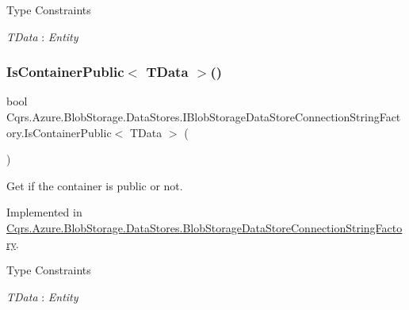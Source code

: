 \begin{Desc}
\item[Type Constraints]\begin{description}
\item[{\em T\+Data} : {\em Entity}]\end{description}
\end{Desc}
\mbox{\label{interfaceCqrs_1_1Azure_1_1BlobStorage_1_1DataStores_1_1IBlobStorageDataStoreConnectionStringFactory_a328ddc36412d9d01fed52aeed545c1a4_a328ddc36412d9d01fed52aeed545c1a4}} 
\subsubsection{\texorpdfstring{Is\+Container\+Public$<$ T\+Data $>$()}{IsContainerPublic< TData >()}}
{\footnotesize\ttfamily bool Cqrs.\+Azure.\+Blob\+Storage.\+Data\+Stores.\+I\+Blob\+Storage\+Data\+Store\+Connection\+String\+Factory.\+Is\+Container\+Public$<$ T\+Data $>$ (\begin{DoxyParamCaption}{ }\end{DoxyParamCaption})}



Get if the container is public or not. 



Implemented in \hyperlink{classCqrs_1_1Azure_1_1BlobStorage_1_1DataStores_1_1BlobStorageDataStoreConnectionStringFactory_a96e368a2b00f9614eff6ca4bcdeb3a24_a96e368a2b00f9614eff6ca4bcdeb3a24}{Cqrs.\+Azure.\+Blob\+Storage.\+Data\+Stores.\+Blob\+Storage\+Data\+Store\+Connection\+String\+Factory}.

\begin{Desc}
\item[Type Constraints]\begin{description}
\item[{\em T\+Data} : {\em Entity}]\end{description}
\end{Desc}
